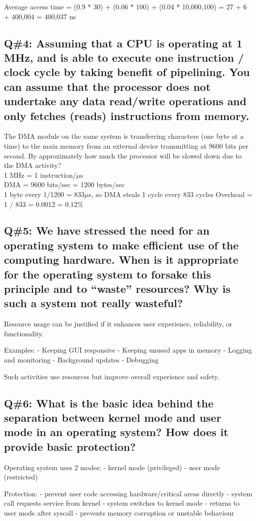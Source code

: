 Average access time = (0.9 * 30) + (0.06 * 100) + (0.04 * 10,000,100)
= 27 + 6 + 400,004 = 400,037 ns

\subsection*{Q\#4: Assuming that a CPU is operating at 1 MHz, and is able to execute one instruction / clock cycle by taking benefit of pipelining. You can assume that the processor does not undertake any data read/write operations and only fetches (reads) instructions from memory.}

The DMA module on the same system is transferring characters (one byte at a time) to the main memory from an external device transmitting at 9600 bits per second. By approximately how much the processor will be slowed down due to the DMA activity?\\
1 MHz = 1 instruction/\(\mu\)s\\
DMA = 9600 bits/sec = 1200 bytes/sec\\
1 byte every 1/1200 = 833\(\mu\)s, so DMA steals 1 cycle every 833 cycles Overhead = 1 / 833 = 0.0012 = 0.12\%

\subsection*{Q\#5: We have stressed the need for an operating system to make efficient use of the computing hardware. When is it appropriate for the operating system to forsake this principle and to “waste” resources? Why is such a system not really wasteful?}
Resource usage can be justified if it enhances user experience, reliability, or functionality.

Examples:
- Keeping GUI responsive
- Keeping unused apps in memory
- Logging and monitoring
- Background updates
- Debugging

Such activities use resources but improve overall experience and safety.

\subsection*{Q\#6: What is the basic idea behind the separation between kernel mode and user mode in an operating system? How does it provide basic protection?}

Operating system uses 2 modes:
- kernel mode (privileged)
- user mode (restricted)

Protection:
- prevent user code accessing hardware/critical areas directly
- system call requests service from kernel
- system switches to kernel mode
- returns to user mode after syscall
- prevents memory corruption or unstable behaviour

